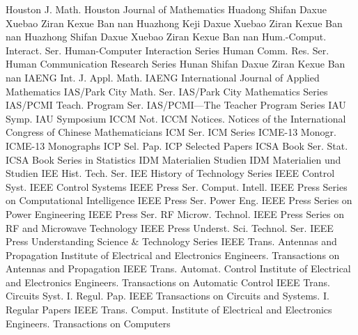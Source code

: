 {Houston J. Math.}
{Houston Journal of Mathematics}
{Huadong Shifan Daxue Xuebao Ziran Kexue Ban}
{nan}
{Huazhong Keji Daxue Xuebao Ziran Kexue Ban}
{nan}
{Huazhong Shifan Daxue Xuebao Ziran Kexue Ban}
{nan}
{Hum.-Comput. Interact. Ser.}
{Human-Computer Interaction Series}
{Human Comm. Res. Ser.}
{Human Communication Research Series}
{Hunan Shifan Daxue Ziran Kexue Ban}
{nan}
{IAENG Int. J. Appl. Math.}
{IAENG International Journal of Applied Mathematics}
{IAS/Park City Math. Ser.}
{IAS/Park City Mathematics Series}
{IAS/PCMI Teach. Program Ser.}
{IAS/PCMI---The Teacher Program Series}
{IAU Symp.}
{IAU Symposium}
{ICCM Not.}
{ICCM Notices. Notices of the International Congress of Chinese Mathematicians}
{ICM Ser.}
{ICM Series}
{ICME-13 Monogr.}
{ICME-13 Monographs}
{ICP Sel. Pap.}
{ICP Selected Papers}
{ICSA Book Ser. Stat.}
{ICSA Book Series in Statistics}
{IDM Materialien Studien}
{IDM Materialien und Studien}
{IEE Hist. Tech. Ser.}
{IEE History of Technology Series}
{IEEE Control Syst.}
{IEEE Control Systems}
{IEEE Press Ser. Comput. Intell.}
{IEEE Press Series on Computational Intelligence}
{IEEE Press Ser. Power Eng.}
{IEEE Press Series on Power Engineering}
{IEEE Press Ser. RF Microw. Technol.}
{IEEE Press Series on RF and Microwave Technology}
{IEEE Press Underst. Sci. Technol. Ser.}
{IEEE Press Understanding Science & Technology Series}
{IEEE Trans. Antennas and Propagation}
{Institute of Electrical and Electronics Engineers. Transactions on Antennas and Propagation}
{IEEE Trans. Automat. Control}
{Institute of Electrical and Electronics Engineers. Transactions on Automatic Control}
{IEEE Trans. Circuits Syst. I. Regul. Pap.}
{IEEE Transactions on Circuits and Systems. I. Regular Papers}
{IEEE Trans. Comput.}
{Institute of Electrical and Electronics Engineers. Transactions on Computers}
